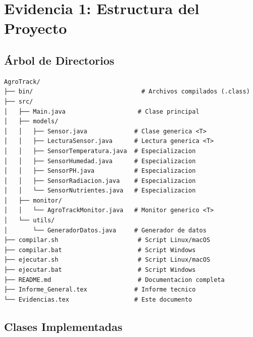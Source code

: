 \documentclass[12pt,a4paper]{article}
\begin{document}

\section{Evidencia 1: Estructura del Proyecto}

\subsection{Árbol de Directorios}

\begin{tcolorbox}[colback=agrogreen!5,colframe=agrogreen,title=\textbf{Estructura Completa del Proyecto}]
\begin{lstlisting}[style=bashstyle,basicstyle=\ttfamily\small]
AgroTrack/
├── bin/                              # Archivos compilados (.class)
├── src/
│   ├── Main.java                    # Clase principal
│   ├── models/
│   │   ├── Sensor.java             # Clase generica <T>
│   │   ├── LecturaSensor.java      # Lectura generica <T>
│   │   ├── SensorTemperatura.java  # Especializacion
│   │   ├── SensorHumedad.java      # Especializacion
│   │   ├── SensorPH.java           # Especializacion
│   │   ├── SensorRadiacion.java    # Especializacion
│   │   └── SensorNutrientes.java   # Especializacion
│   ├── monitor/
│   │   └── AgroTrackMonitor.java   # Monitor generico <T>
│   └── utils/
│       └── GeneradorDatos.java     # Generador de datos
├── compilar.sh                      # Script Linux/macOS
├── compilar.bat                     # Script Windows
├── ejecutar.sh                      # Script Linux/macOS
├── ejecutar.bat                     # Script Windows
├── README.md                        # Documentacion completa
├── Informe_General.tex             # Informe tecnico
└── Evidencias.tex                  # Este documento
\end{lstlisting}
\end{tcolorbox}

\subsection{Clases Implementadas}
\end{document}
